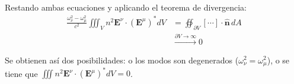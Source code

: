 Restando ambas ecuaciones y aplicando el teorema de divergencia:
\begin{align*}
	\frac{\omega_\nu^2 - \omega_\mu^2}{c^2} \iiint_V n^2 \textbf{E}^\nu \cdot \left(\textbf{E}^\mu\right)^* dV &= \oiint_{\partial V} \left[ \cdots \right] \cdot \hat{\textbf{n}}\,dA \\
	&\xrightarrow{\partial V \to \infty} 0
\end{align*}

Se obtienen así dos posibilidades: o los modos son degenerados ($\omega_\nu^2 = \omega_\mu^2$), o se tiene que $\iiint n^2 \textbf{E}^\nu \cdot \left(\textbf{E}^\mu\right)^* dV = 0$.
